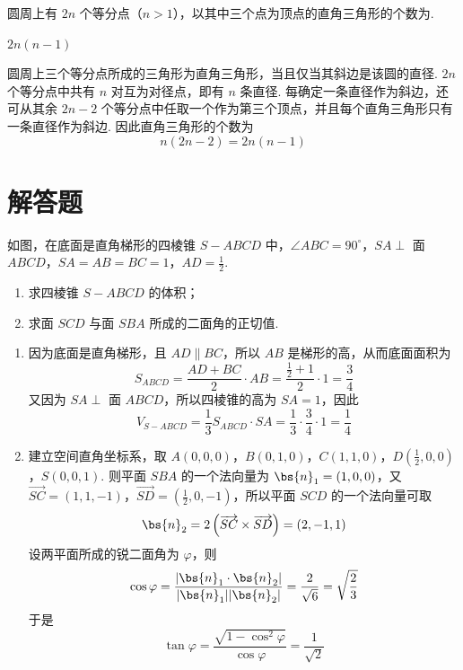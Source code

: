 \begin{problem}
圆周上有 \(2n\) 个等分点（\(n > 1\)），以其中三个点为顶点的直角三角形的个数为\fillinblank{}.
\end{problem}

\begin{answer}
\(2n(n-1)\)
\end{answer}

\begin{solution}
圆周上三个等分点所成的三角形为直角三角形，当且仅当其斜边是该圆的直径. \(2n\) 个等分点中共有 \(n\) 对互为对径点，即有 \(n\) 条直径. 每确定一条直径作为斜边，还可从其余 \(2n-2\) 个等分点中任取一个作为第三个顶点，并且每个直角三角形只有一条直径作为斜边. 因此直角三角形的个数为
\[
n(2n-2)=2n(n-1)
\]
\end{solution}

\section{解答题}
\begin{problem}
如图，在底面是直角梯形的四棱锥 \(S - ABCD\) 中，\(\angle ABC = 90^{\circ}\)，\(SA \perp\) 面 \(ABCD\)，\(SA = AB = BC = 1\)，\(AD = \frac{1}{2}\).

\begin{enumerate}
\item 求四棱锥 \(S - ABCD\) 的体积；
\item 求面 \(SCD\) 与面 \(SBA\) 所成的二面角的正切值.
\end{enumerate}

\end{problem}

\begin{solution}
\begin{enumerate}
\item 因为底面是直角梯形，且 \(AD\parallel BC\)，所以 \(AB\) 是梯形的高，从而底面面积为
\[
S_{ABCD}=\frac{AD+BC}{2}\cdot AB=\frac{\frac12+1}{2}\cdot1=\frac34
\]
又因为 \(SA\perp\) 面 \(ABCD\)，所以四棱锥的高为 \(SA=1\)，因此
\[
V_{S-ABCD}=\frac13S_{ABCD}\cdot SA=\frac13\cdot\frac34\cdot1=\frac14
\]
\item 建立空间直角坐标系，取 \(A(0,0,0)\)，\(B(0,1,0)\)，\(C(1,1,0)\)，\(D\left(\frac12,0,0\right)\)，\(S(0,0,1)\). 则平面 \(SBA\) 的一个法向量为 \(\bs{n}_1=(1,0,0)\)，又 \(\overrightarrow{SC}=(1,1,-1)\)，\(\overrightarrow{SD}=\left(\frac12,0,-1\right)\)，所以平面 \(SCD\) 的一个法向量可取
\[
\bs{n}_2=2\left(\overrightarrow{SC}\times\overrightarrow{SD}\right)=(2,-1,1)
\]
设两平面所成的锐二面角为 \(\varphi\)，则
\[
\cos\varphi=\frac{|\bs{n}_1\cdot\bs{n}_2|}{|\bs{n}_1||\bs{n}_2|}=\frac{2}{\sqrt6}=\sqrt{\frac23}
\]
于是
\[
\tan\varphi=\frac{\sqrt{1-\cos^2\varphi}}{\cos\varphi}=\frac{1}{\sqrt2}
\]
\end{enumerate}
\end{solution}

